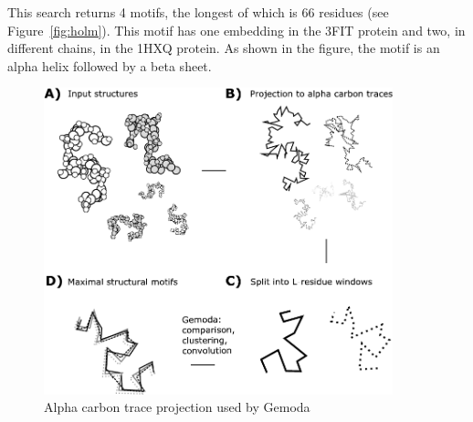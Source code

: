     This search returns 4 motifs, the longest of
    which is 66 residues (see Figure~\vref{fig:holm}).
    This motif has one embedding in the 3FIT protein
    and two, in different chains, in the 1HXQ protein.
    As shown in the figure, the motif is an alpha helix
    followed by a beta sheet.

    \begin{figure}[ptb]
        \centering
        \includegraphics[width=0.90\textwidth]{Body/Images-chap3/rmsd.pdf}
        \caption[Alpha carbon trace projection used  by Gemoda]{Alpha carbon trace projection used  by Gemoda}
        \label{fig:trace}
    \end{figure}

